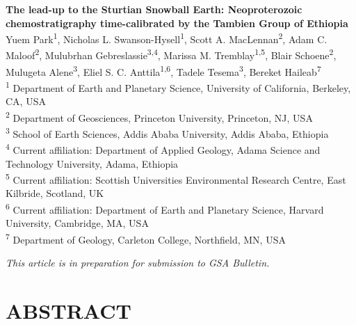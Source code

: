 \documentclass[11pt,letterpaper]{article}
\begin{document}
\begin{flushleft}
{\Large \textbf{The lead-up to the Sturtian Snowball Earth: Neoproterozoic chemostratigraphy time-calibrated by the Tambien Group of Ethiopia}}
\\
Yuem Park\textsuperscript{1},
Nicholas L. Swanson-Hysell\textsuperscript{1},
Scott A. MacLennan\textsuperscript{2},
Adam C. Maloof\textsuperscript{2},
Mulubrhan Gebreslassie\textsuperscript{3,4},
Marissa M. Tremblay\textsuperscript{1,5},
Blair Schoene\textsuperscript{2},
Mulugeta Alene\textsuperscript{3},
Eliel S. C. Anttila\textsuperscript{1,6},
Tadele Tesema\textsuperscript{3},
Bereket Haileab\textsuperscript{7}
\\
\bigskip
\textsuperscript{1} Department of Earth and Planetary Science, University of California, Berkeley, CA, USA
\\
\textsuperscript{2} Department of Geosciences, Princeton University, Princeton, NJ, USA
\\
\textsuperscript{3} School of Earth Sciences, Addis Ababa University, Addis Ababa, Ethiopia
\\
\textsuperscript{4} Current affiliation: Department of Applied Geology, Adama Science and Technology University, Adama, Ethiopia
\\
\textsuperscript{5} Current affiliation: Scottish Universities Environmental Research Centre, East Kilbride, Scotland, UK
\\
\textsuperscript{6} Current affiliation: Department of Earth and Planetary Science, Harvard University, Cambridge, MA, USA
\\
\textsuperscript{7} Department of Geology, Carleton College, Northfield, MN, USA
\bigskip

\end{flushleft}

\noindent\textit{This article is in preparation for submission to GSA Bulletin.}

\linenumbers

\section*{ABSTRACT \label{sec:ABSTRACT}}
\end{document}
